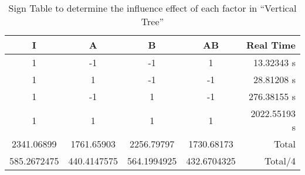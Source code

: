 \begin{table}[h]
	\caption{Sign Table to determine the influence effect of each factor in ``Vertical Tree''}
	\center
	\begin{tabular}{ c c c c r }
		\hline
		I & A & B & AB & Real Time \\
		\hline
		1 & -1 & -1 &  1 &   13.32343 s \\
		1 &  1 & -1 & -1 &   28.81208 s \\
		1 & -1 &  1 & -1 &  276.38155 s \\
		1 &  1 &  1 &  1 & 2022.55193 s \\
		\hline
		2341.06899 & 1761.65903 & 2256.79797 & 1730.68173 & Total \\
		585.2672475 & 440.4147575 & 564.1994925 & 432.6704325 & Total/4 \\
		\hline
	\end{tabular}
\end{table}